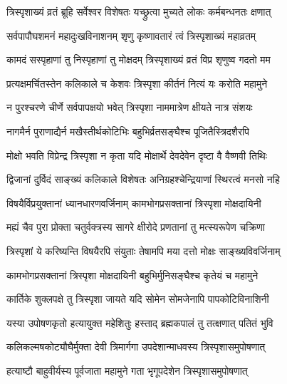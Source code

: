 \label{sec:padma-trisprisha}

\ganapatyadiDhyanam
\padmaPuranam



\twolineshloka
{त्रिस्पृशाख्यं व्रतं ब्रूहि सर्वेश्वर विशेषतः}
{यच्छ्रुत्वा मुच्यते लोकः कर्मबन्धनतः क्षणात्}%


\twolineshloka
{सर्वपापौघशमनं महादुःखविनाशनम्}
{शृणु कृष्णावतारं त्वं त्रिस्पृशाख्यं महाव्रतम्}%

\twolineshloka
{कामदं सस्पृहाणां तु निस्पृहाणां तु मोक्षदम्}
{त्रिस्पृशाख्यं व्रतं विप्र शृणुष्व गदतो मम}%

\twolineshloka
{प्रत्यक्षमर्चितस्तेन कलिकाले च केशवः}
{त्रिस्पृशा कीर्तनं नित्यं यः करोति महामुने}%

\twolineshloka
{न पुरश्चरणे चीर्णे सर्वपापक्षयो भवेत्}
{त्रिस्पृशा नाममात्रेण क्षीयते नात्र संशयः}%

\twolineshloka
{नागमैर्न पुराणाद्यैर्न मखैस्तीर्थकोटिभिः}
{बहुभिर्व्रतसङ्घैश्च पूजितैस्त्रिदशैरपि}%

\twolineshloka
{मोक्षो भवति विप्रेन्द्र त्रिस्पृशा न कृता यदि}
{मोक्षार्थे देवदेवेन दृष्टा वै वैष्णवी तिथिः}%

\twolineshloka
{द्विजानां दुर्विदं साङ्ख्यं कलिकाले विशेषतः}
{अनिग्रहश्चेन्द्रियाणां स्थिरत्वं मनसो नहि}%

\twolineshloka
{विषयैर्विप्रयुक्तानां ध्यानधारणवर्जिनाम्}
{कामभोगप्रसक्तानां त्रिस्पृशा मोक्षदायिनी}%

\twolineshloka
{मह्यं चैव पुरा प्रोक्ता चतुर्वक्त्रस्य सागरे}
{क्षीरोदे प्रणतानां तु मत्स्यरूपेण चक्रिणा}%

\twolineshloka
{त्रिस्पृशां ये करिष्यन्ति विषयैरपि संयुताः}
{तेषामपि मया दत्तो मोक्षः साङ्ख्यविवर्जिनाम्}%

\twolineshloka
{कामभोगप्रसक्तानां त्रिस्पृशा मोक्षदायिनी}
{बहुभिर्मुनिसङ्घैश्च कृतेयं च महामुने}%

\twolineshloka
{कार्तिके शुक्लपक्षे तु त्रिस्पृशा जायते यदि}
{सोमेन सोमजेनापि पापकोटिविनाशिनी}%

\twolineshloka
{यस्या उपोषणकृतो हत्यायुक्त महेशितुः}
{हस्ताद् ब्रह्मकपालं तु तत्क्षणात् पतितं भुवि}%

\twolineshloka
{कलिकल्मषकोट्यौघैर्मुक्ता देवी त्रिमार्गगा}
{उपदेशान्माधवस्य त्रिस्पृशासमुपोषणात्}%

\twolineshloka
{हत्याष्टौ बाहुवीर्यस्य पूर्वजाता महामुने}
{गता भृगूपदेशेन त्रिस्पृशासमुपोषणात्}%

